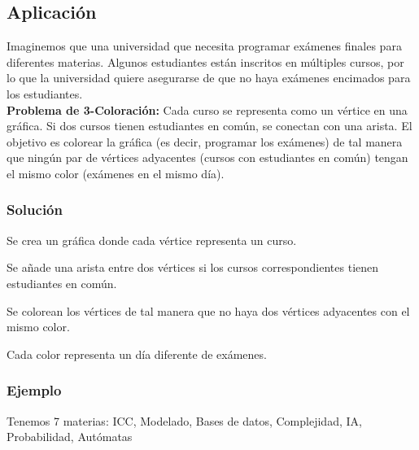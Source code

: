 \subsection{\textcolor{Contraste4}{Aplicación}}

Imaginemos que una universidad que necesita programar exámenes finales para diferentes 
materias. Algunos estudiantes están inscritos en múltiples cursos, por lo que la 
universidad quiere asegurarse de que no haya exámenes encimados para los estudiantes.\\ 

\textbf{Problema de 3-Coloración:} Cada curso se representa como un vértice en una gráfica. 
Si dos cursos tienen estudiantes en común, se conectan con una arista. El objetivo es 
colorear la gráfica (es decir, programar los exámenes) de tal manera que ningún par de 
vértices adyacentes (cursos con estudiantes en común) tengan el mismo color 
(exámenes en el mismo día).

\subsubsection*{\textcolor{Contraste3}{Solución}}

\begin{myitemize}
    \item Se crea un gráfica donde cada vértice representa un curso.
    \item Se añade una arista entre dos vértices si los cursos correspondientes tienen estudiantes en común.
    \item Se colorean los vértices de tal manera que no haya dos vértices adyacentes con el mismo color.
    \item Cada color representa un día diferente de exámenes.
\end{myitemize}

\subsubsection*{\textcolor{Contraste3}{Ejemplo}}

Tenemos 7 materias: ICC, Modelado, Bases de datos, Complejidad, IA, Probabilidad, Autómatas \\ 

